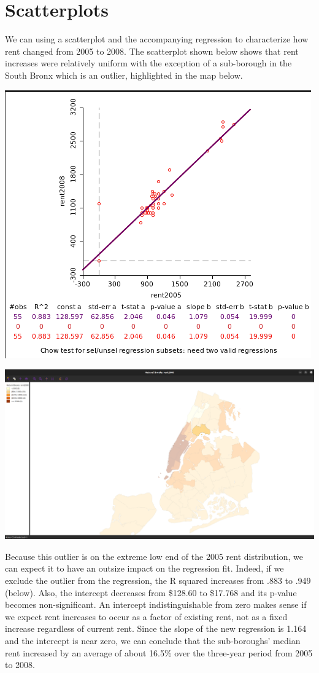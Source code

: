 \documentclass[11pt]{article}
\begin{document}
\section{Scatterplots}
\label{sec:orgf5011b8}
We can using a scatterplot and the accompanying regression to characterize how rent changed from 2005 to 2008. The scatterplot shown below shows that rent increases were relatively uniform with the exception of a sub-borough in the South Bronx which is an outlier, highlighted in the map below.

\begin{center}
\includegraphics[width=.9\linewidth]{scatter.png}
\end{center}
\begin{center}
\includegraphics[width=.9\linewidth]{outlier.png}
\end{center}

Because this outlier is on the extreme low end of the 2005 rent
distribution, we can expect it to have an outsize impact on the
regression fit. Indeed, if we exclude the outlier from the regression,
the R squared increases from .883 to .949 (below). Also, the intercept
decreases from \$128.60 to \$17.768 and its p-value becomes
non-significant. An intercept indistinguishable from zero makes sense
if we expect rent increases to occur as a factor of existing rent, not
as a fixed increase regardless of current rent. Since the slope of the
new regression is 1.164 and the intercept is near zero, we can
conclude that the sub-boroughs' median rent increased by an average of
about 16.5\% over the three-year period from 2005 to 2008.
\end{document}
